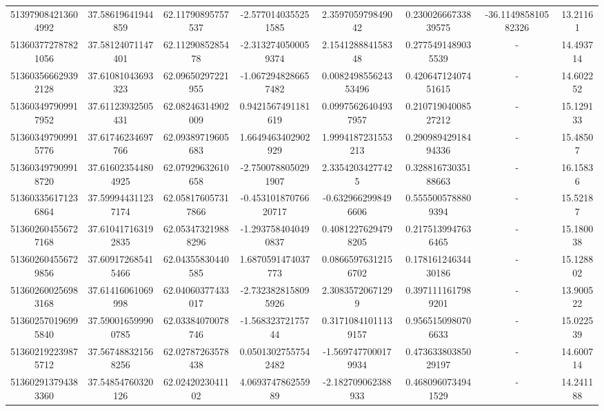 \documentclass{article}
\begin{document}
\begin{landscape}
\begin{longtable}[c]{S[table-format=18.0]S[table-format=2.15]S[table-format=2.15]S[table-format=-2.17]S[table-format=-2.16]S[table-format=-2.16]S[table-format=-3.16]S[table-format=2.7]}
513979084213604992 & 37.58619641944859  & 62.11790895757537  & -2.5770140355251585   & 2.359705979849042     & 0.23002666733839575 & -36.114985810582326 & 13.21161   \\
513603772787821056 & 37.58124071147401  & 62.1129085285478   & -2.3132740500059374   & 2.154128884158348     & 0.2775491489035539  & {-}                  & 14.493714  \\
513603566629392128 & 37.61081043693323  & 62.09650297221955  & -1.0672948286657482   & 0.008249855624353496  & 0.42064712407451615 & {-}                  & 14.602252  \\
513603497909917952 & 37.61123932505431  & 62.08246314902009  & 0.9421567491181619    & 0.09975626404937957   & 0.21071904008527212 & {-}                  & 15.129133  \\
513603497909915776 & 37.61746234697766  & 62.09389719605683  & 1.6649463402902929    & 1.9994187231553213    & 0.29098942918494336 & {-}                  & 15.48507   \\
513603497909918720 & 37.616023544804925 & 62.07929632610658  & -2.7500788050291907   & 2.33542034277425      & 0.32881673035188663 & {-}                  & 16.15836   \\
513603356171236864 & 37.599944311237174 & 62.058176057317866 & -0.45310187076620717  & -0.6329662998496606   & 0.5555005788809394  & {-}                  & 15.52187   \\
513602604556727168 & 37.610417163192835 & 62.053473219888296 & -1.2937584040490837   & 0.40812276294798205   & 0.2175139947636465  & {-}                  & 15.180038  \\
513602604556729856 & 37.609172685415466 & 62.04355830440585  & 1.6870591474037773    & 0.08665976312156702   & 0.17816124634430186 & {-}                  & 15.128802  \\
513602600256983168 & 37.61416061069998  & 62.04060377433017  & -2.7323828158095926   & 2.30835720671299      & 0.3971111617989201  & {-}                  & 13.900522  \\
513602570196995840 & 37.590016599900785 & 62.03384070078746  & -1.56832372175744     & 0.31710841011139157   & 0.9565150980706633  & {-}                  & 15.022539  \\
513602192239875712 & 37.567488321568256 & 62.02787263578438  & 0.05013027557542482   & -1.5697477000179934   & 0.47363380385029197 & {-}                  & 14.600714  \\
513602913794383360 & 37.54854760320126  & 62.0242023041102   & 4.069374786255989     & -2.182709062388933    & 0.4680960734941529  & {-}                  & 14.241188  \\

\end{longtable}
\end{landscape}
\end{document}

